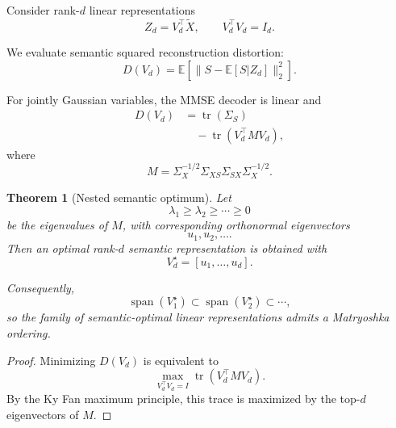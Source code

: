 \documentclass[11pt]{article}
\newtheorem{theorem}{Theorem}
\newcommand{\E}{\mathbb{E}}
\begin{document}
Consider rank-$d$ linear representations
\begin{equation}
    Z_d=V_d^\top\widetilde X,
    \qquad
    V_d^\top V_d=I_d.
\end{equation}

We evaluate semantic squared reconstruction distortion:
\begin{equation}
    D(V_d)
    =
    \E
    \left[
        \|
            S-\E[S|Z_d]
        \|_2^2
    \right].
\end{equation}

For jointly Gaussian variables, the MMSE decoder is linear and
\begin{equation}
\begin{aligned}
    D(V_d)
    &=
    \operatorname{tr}(\Sigma_S)
    \\
    &\quad -
    \operatorname{tr}
    \left(
        V_d^\top
        M
        V_d
    \right),
\end{aligned}
\end{equation}
where
\begin{equation}
\boxed{
    M
    =
    \Sigma_X^{-1/2}
    \Sigma_{XS}
    \Sigma_{SX}
    \Sigma_X^{-1/2}.
}
\label{eq:predictive-matrix}
\end{equation}

\begin{theorem}[Nested semantic optimum]
Let
\begin{equation}
    \lambda_1\geq
    \lambda_2\geq\cdots\geq0
\end{equation}
be the eigenvalues of $M$, with corresponding orthonormal eigenvectors
\begin{equation}
    u_1,u_2,\ldots.
\end{equation}
Then an optimal rank-$d$ semantic representation is obtained with
\begin{equation}
\boxed{
    V_d^\star
    =
    [u_1,\ldots,u_d].
}
\end{equation}

Consequently,
\begin{equation}
    \operatorname{span}(V_1^\star)
    \subset
    \operatorname{span}(V_2^\star)
    \subset
    \cdots,
\end{equation}
so the family of semantic-optimal linear representations admits a Matryoshka ordering.
\end{theorem}

\begin{proof}
Minimizing $D(V_d)$ is equivalent to
\begin{equation}
    \max_{V_d^\top V_d=I}
    \operatorname{tr}
    (
        V_d^\top M V_d
    ).
\end{equation}
By the Ky Fan maximum principle, this trace is maximized by the top-$d$ eigenvectors of $M$.
\end{proof}
\end{document}
